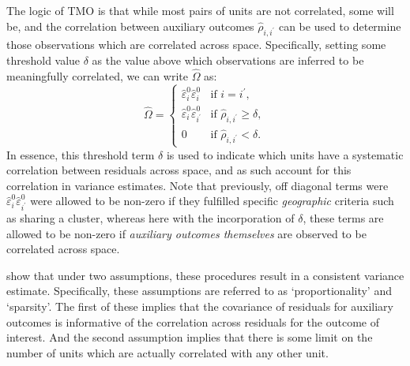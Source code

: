 \documentclass[varwidth,bib]{statapress}
\begin{document}
The logic of TMO is that while most pairs of units are not correlated, some will be, and the correlation between auxiliary outcomes $\widehat\rho_{i,i^\prime}$ can be used to determine those observations which are correlated across space.  Specifically, setting some threshold value $\delta$ as the value above which observations are inferred to be meaningfully correlated, we can write $\widehat\Omega$ as:
\[
\widehat\Omega = 
\begin{cases}
  \widehat\varepsilon_i^{0}\widehat\varepsilon_i^{0} & \text{if } i=i^\prime, \\
  \widehat\varepsilon_i^{0}\widehat\varepsilon_{i^\prime}^{0} & \text{if } \widehat\rho_{i,i^\prime}\geq\delta, \\
  0 & \text{if } \widehat\rho_{i,i^\prime}<\delta.
\end{cases}
\]
In essence, this threshold term $\delta$ is used to indicate which units have a systematic correlation between residuals across space, and as such account for this correlation in variance estimates.  Note that previously, off diagonal terms were $\widehat\varepsilon_i^{0}\widehat\varepsilon_{i^\prime}^{0}$ were allowed to be non-zero if they fulfilled specific \textit{geographic} criteria such as sharing a cluster, whereas here with the incorporation of $\delta$, these terms are allowed to be non-zero if \textit{auxiliary outcomes themselves} are observed to be correlated across space.

\citet{Dellavignaetal2025} show that under two assumptions, these procedures result in a consistent variance estimate.  Specifically, these assumptions are referred to as `proportionality' and `sparsity'.  The first of these implies that the covariance of residuals for auxiliary outcomes is informative of the correlation across residuals for the outcome of interest.  And the second assumption implies that there is some limit on the number of units which are actually correlated with any other unit. 
\end{document}
